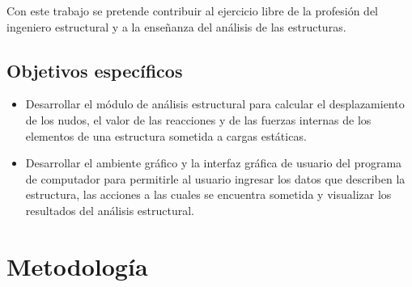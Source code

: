 Con este trabajo se pretende contribuir al ejercicio libre de la profesión del ingeniero estructural y a la enseñanza del análisis de las estructuras.
\subsection{Objetivos específicos}

\begin{itemize}
\item Desarrollar el módulo de análisis estructural para calcular el desplazamiento de los nudos, el valor de las reacciones y de las fuerzas internas de los elementos de una estructura sometida a cargas estáticas.
\item Desarrollar el ambiente gráfico y la interfaz gráfica de usuario del programa de computador para permitirle al usuario ingresar los datos que describen la estructura, las acciones a las cuales se encuentra sometida y visualizar los resultados del análisis estructural.
\end{itemize}

\section{Metodología}

